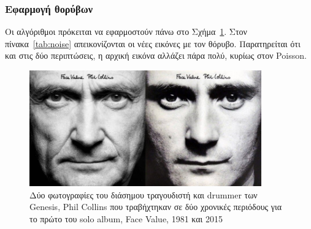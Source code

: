 \subsubsection{Εφαρμογή θορύβων}

Οι αλγόριθμοι πρόκειται να εφαρμοστούν πάνω στο Σχήμα~\ref{fig:collins}.
Στον πίνακα~\ref{tab:noise} απεικονίζονται οι νέες εικόνες με τον θόρυβο.
Παρατηρείται ότι και στις δύο περιπτώσεις, η αρχική εικόνα αλλάζει πάρα πολύ, κυρίως στον Poisson.

\begin{figure}[H]
  \centering
  \includegraphics[width=100mm]{Figures/face_value}
  \caption[Phil Collins - Face Value]{Δύο φωτογραφίες του διάσημου τραγουδιστή και drummer των Genesis, Phil Collins που τραβήχτηκαν σε δύο χρονικές περιόδους για το πρώτο του solo album, Face Value, 1981 και 2015}
  \label{fig:collins}
\end{figure}

